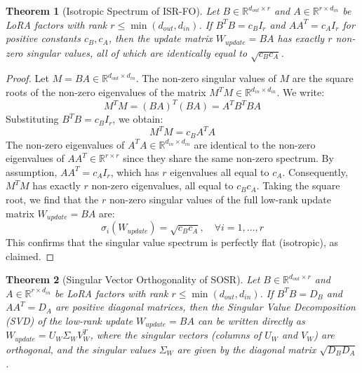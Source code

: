 \documentclass{article}
\newtheorem{theorem}{Theorem}[section]
\begin{document}
\begin{theorem}[Isotropic Spectrum of ISR-FO]
\label{thm:isr_flat}
Let $B \in \mathbb{R}^{d_{out} \times r}$ and $A \in \mathbb{R}^{r \times d_{in}}$ be LoRA factors with rank $r \le \min(d_{out}, d_{in})$. If $B^T B = c_B I_r$ and $A A^T = c_A I_r$ for positive constants $c_B, c_A$, then the update matrix $W_{update} = B A$ has exactly $r$ non-zero singular values, all of which are identically equal to $\sqrt{c_B c_A}$.
\end{theorem}

\begin{proof}
Let $M = B A \in \mathbb{R}^{d_{out} \times d_{in}}$. The non-zero singular values of $M$ are the square roots of the non-zero eigenvalues of the matrix $M^T M \in \mathbb{R}^{d_{in} \times d_{in}}$. We write:
\begin{equation}
    M^T M = (B A)^T (B A) = A^T B^T B A
\end{equation}
Substituting $B^T B = c_B I_r$, we obtain:
\begin{equation}
    M^T M = c_B A^T A
\end{equation}
The non-zero eigenvalues of $A^T A \in \mathbb{R}^{d_{in} \times d_{in}}$ are identical to the non-zero eigenvalues of $A A^T \in \mathbb{R}^{r \times r}$ since they share the same non-zero spectrum. By assumption, $A A^T = c_A I_r$, which has $r$ eigenvalues all equal to $c_A$. Consequently, $M^T M$ has exactly $r$ non-zero eigenvalues, all equal to $c_B c_A$. Taking the square root, we find that the $r$ non-zero singular values of the full low-rank update matrix $W_{update} = B A$ are:
\begin{equation}
    \sigma_i(W_{update}) = \sqrt{c_B c_A}, \quad \forall i = 1, \dots, r
\end{equation}
This confirms that the singular value spectrum is perfectly flat (isotropic), as claimed.
\end{proof}

\begin{theorem}[Singular Vector Orthogonality of SOSR]
\label{thm:sosr_ortho}
Let $B \in \mathbb{R}^{d_{out} \times r}$ and $A \in \mathbb{R}^{r \times d_{in}}$ be LoRA factors with rank $r \le \min(d_{out}, d_{in})$. If $B^T B = D_B$ and $A A^T = D_A$ are positive diagonal matrices, then the Singular Value Decomposition (SVD) of the low-rank update $W_{update} = B A$ can be written directly as $W_{update} = U_W \Sigma_W V_W^T$, where the singular vectors (columns of $U_W$ and $V_W$) are orthogonal, and the singular values $\Sigma_W$ are given by the diagonal matrix $\sqrt{D_B D_A}$.
\end{theorem}
\end{document}
